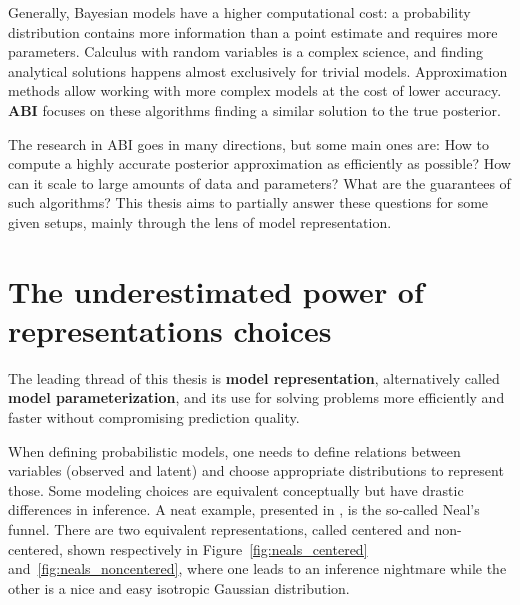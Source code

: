 Generally, Bayesian models have a higher computational cost: a probability distribution contains more information than a point estimate and requires more parameters.
Calculus with random variables is a complex science, and finding analytical solutions happens almost exclusively for trivial models.
Approximation methods allow working with more complex models at the cost of lower accuracy. 
\textbf{\ac{ABI}} focuses on these algorithms finding a similar solution to the true posterior.

The research in \ac{ABI} goes in many directions, but some main ones are: How to compute a highly accurate posterior approximation as efficiently as possible? How can it scale to large amounts of data and parameters? What are the guarantees of such algorithms?
This thesis aims to partially answer these questions for some given setups, mainly through the lens of model representation.

\section{The underestimated power of representations choices}

The leading thread of this thesis is \textbf{model representation}, alternatively called \textbf{model parameterization}, and its use for solving problems more efficiently and faster without compromising prediction quality.

When defining probabilistic models, one needs to define relations between variables (observed and latent) and choose appropriate distributions to represent those.
Some modeling choices are equivalent conceptually but have drastic differences in inference.
A neat example, presented in \citet{gorinovaAutomaticReparameterisationProbabilistic2020}, is the so-called Neal's funnel.
There are two equivalent representations, called centered and non-centered, shown respectively in Figure~\ref{fig:neals_centered} and~\ref{fig:neals_noncentered}, where one leads to an inference nightmare while the other is a nice and easy isotropic Gaussian distribution.

